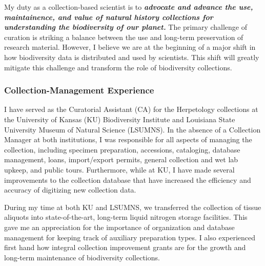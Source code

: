 My duty as a collection-based scientist is to \textbf{\textit{advocate and
advance the use, maintainence, and value of natural history collections for
understanding the biodiversity of our planet.}}
The primary challenge of curation is striking a balance between the use and
long-term preservation of research material.
However, I believe we are at the beginning of a major shift in how
biodiversity data is distributed and used by scientists.
This shift will greatly mitigate this challenge and transform the role of
biodiversity collections.


\subsubsection*{Collection-Management Experience}
I have served as the Curatorial Assistant (CA) for the Herpetology collections
at the University of Kansas (KU) Biodiversity Institute and Louisiana State
University Museum of Natural Science (LSUMNS).
In the absence of a Collection Manager at both institutions, I was responsible
for all aspects of managing the collection, including specimen preparation,
accessions, cataloging, database management, loans, import/export permits, 
general collection and wet lab upkeep, and public tours.
Furthermore, while at KU, I have made several improvements to the collection
database that have increased the efficiency and accuracy of digitizing new
collection data.

During my time at both KU and LSUMNS, we transferred the collection of tissue
aliquots into state-of-the-art, long-term liquid nitrogen storage facilities.
This gave me an appreciation for the importance of organization and database
management for keeping track of auxiliary preparation types.
I also experienced first hand how integral collection improvement grants are
for the growth and long-term maintenance of biodiversity collections.


